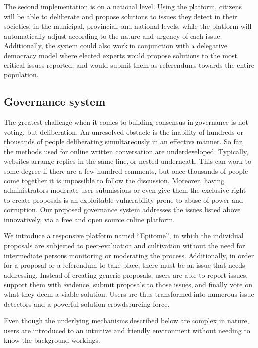 \documentclass[a4paper,11pt]{article}
\begin{document}
\begin{multicols}{2}
The second implementation is on a national level. Using the platform, citizens will be able to deliberate and propose solutions to issues they detect in their societies, in the municipal, provincial, and national levels, while the platform will automatically adjust according to the nature and urgency of each issue. Additionally, the system could also work in conjunction with a delegative democracy model where elected experts would propose solutions to the most critical issues reported, and would submit them as referendums towards the entire population.

\subsection{Governance system} \label{governance}

The greatest challenge when it comes to building consensus in governance is not voting, but deliberation. An unresolved obstacle is the inability of hundreds or thousands of people deliberating simultaneously in an effective manner. So far, the methods used for online written conversation are underdeveloped. Typically, websites arrange replies in the same line, or nested underneath. This can work to some degree if there are a few hundred comments, but once thousands of people come together it is impossible to follow the discussion. Moreover, having administrators moderate user submissions or even give them the exclusive right to create proposals is an exploitable vulnerability prone to abuse of power and corruption. Our proposed governance system addresses the issues listed above innovatively, via a free and open source online platform.

We introduce a responsive platform named ``Epitome'', in which the individual proposals are subjected to peer-evaluation and cultivation without the need for intermediate persons monitoring or moderating the process. Additionally, in order for a proposal or a referendum to take place, there must be an issue that needs addressing. Instead of creating generic proposals, users are able to report issues, support them with evidence, submit proposals to those issues, and finally vote on what they deem a viable solution. Users are thus transformed into numerous issue detectors and a powerful solution-crowdsourcing force.

Even though the underlying mechanisms described below are complex in nature, users are introduced to an intuitive and friendly environment without needing to know the background workings.


\end{multicols}
\end{document}
